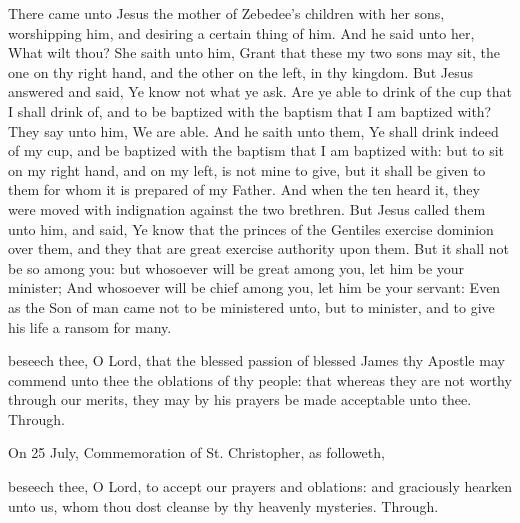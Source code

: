 
 There came unto Jesus the mother of Zebedee's children with her sons, worshipping him, and desiring a certain thing of him. And he said unto her, What wilt thou? She saith unto him, Grant that these my two sons may sit, the one on thy right hand, and the other on the left, in thy kingdom. But Jesus answered and said, Ye know not what ye ask. Are ye able to drink of the cup that I shall drink of, and to be baptized with the baptism that I am baptized with? They say unto him, We are able. And he saith unto them, Ye shall drink indeed of my cup, and be baptized with the baptism that I am baptized with: but to sit on my right hand, and on my left, is not mine to give, but it shall be given to them for whom it is prepared of my Father. And when the ten heard it, they were moved with indignation against the two brethren. But Jesus called them unto him, and said, Ye know that the princes of the Gentiles exercise dominion over them, and they that are great exercise authority upon them. But it shall not be so among you: but whosoever will be great among you, let him be your minister; And whosoever will be chief among you, let him be your servant: Even as the Son of man came not to be ministered unto, but to minister, and to give his life a ransom for many.


\secret
{} beseech thee, O Lord, that the blessed passion of blessed James thy Apostle may commend unto thee the oblations of thy people: that whereas they are not worthy through our merits, they may by his prayers be made acceptable unto thee. Through.
\begin{rubric}
	 On 25 July, Commemoration of St. Christopher, as followeth,
\end{rubric}
 beseech thee, O Lord, to accept our prayers and oblations: and graciously hearken unto us, whom thou dost cleanse by thy heavenly mysteries. Through.


\vspace{-0.25\baselineskip}

